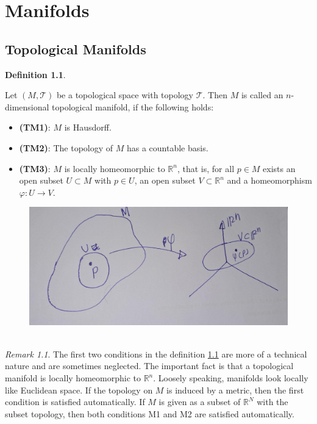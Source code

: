 \documentclass[
]{book}
\providecommand{\tightlist}{%
  \setlength{\itemsep}{0pt}\setlength{\parskip}{0pt}}
\theoremstyle{definition}
\newtheorem{definition}{Definition}[chapter]
\theoremstyle{definition}
\theoremstyle{definition}
\theoremstyle{definition}
\theoremstyle{remark}
\newtheorem*{remark}{Remark}
\begin{document}
\hypertarget{manifolds}{%
\chapter{Manifolds}\label{manifolds}}

\hypertarget{topological-manifolds}{%
\section{Topological Manifolds}\label{topological-manifolds}}

\begin{definition}
\protect\hypertarget{def:topmanifold}{}\label{def:topmanifold}

Let \((M,\mathcal{T})\) be a topological space with topology \(\mathcal{T}\). Then \(M\) is called an \(n\)-dimensional topological manifold, if the following holds:

\begin{itemize}
\tightlist
\item
  \textbf{(TM1)}: \(M\) is Hausdorff.
\item
  \textbf{(TM2)}: The topology of \(M\) has a countable basis.
\item
  \textbf{(TM3)}: \(M\) is locally homeomorphic to \(\mathbb{R}^n\), that is, for all \(p \in M\) exists an open subset \(U \subset M\) with \(p \in U\), an open subset \(V \subset \mathbb{R}^n\) and a homeomorphism \(\varphi : U \rightarrow V\).
\end{itemize}

\end{definition}

\begin{figure}
\centering
\includegraphics{figures/ch1/fig02.jpg}
\caption{\label{fig:fig02}\(~\)}
\end{figure}

\begin{remark}
The first two conditions in the definition \ref{def:topmanifold} are more of a technical nature and are sometimes neglected. The important fact is that a topological manifold is locally homeomorphic to \(\mathbb{R}^n\). Loosely speaking, manifolds look locally like Euclidean space. If the topology on \(M\) is induced by a metric, then the first condition is satisfied automatically. If \(M\) is given as a subset of \(\mathbb{R}^N\) with the subset topology, then both conditions M1 and M2 are satisfied automatically.
\end{remark}
\end{document}
